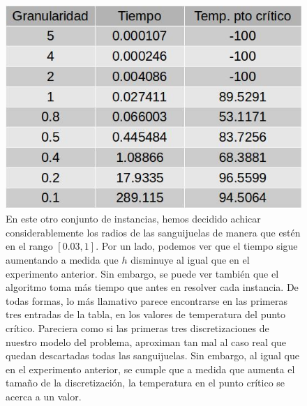 \begin{figure}[H]
\centering
\includegraphics[scale=0.4]{instancia20x20_2.jpg}\caption{En este otro conjunto de instancias, hemos decidido achicar considerablemente los radios de las sanguijuelas de manera que estén en el rango $[0.03, 1]$. Por un lado, podemos ver que el tiempo sigue aumentando a medida que $h$ disminuye al igual que en el experimento anterior. Sin embargo, se puede ver también que el algoritmo toma más tiempo que antes en resolver cada instancia. De todas formas, lo más llamativo parece encontrarse en las primeras tres entradas de la tabla, en los valores de temperatura del punto crítico. Pareciera como si las primeras tres discretizaciones de nuestro modelo del problema, aproximan tan mal al caso real que quedan descartadas todas las sanguijuelas. Sin embargo, al igual que en el experimento anterior, se cumple que a medida que aumenta el tamaño de la discretización, la temperatura en el punto crítico se acerca a un valor.}
\end{figure}

